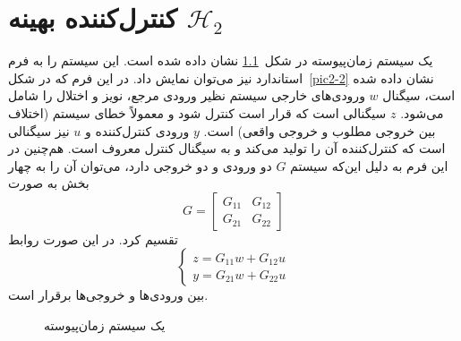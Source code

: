 \chapter{کنترل‌کننده بهینه $\mathcal{H}_2$}

یک سیستم زمان‌پیوسته در شکل~\ref{pic2-1} نشان داده شده است. این سیستم را به فرم استاندارد نیز می‌توان نمایش داد. در این فرم که در شکل~\ref{pic2-2} نشان داده شده است، سیگنال $w$ ورودی‌های خارجی سیستم نظیر ورودی مرجع، نویز و اختلال را شامل می‌شود. $z$ سیگنالی است که قرار است کنترل شود و معمولاً خطای سیستم (اختلاف بین خروجی مطلوب و خروجی واقعی) است. $y$ ورودی کنترل‌کننده و $u$ نیز سیگنالی است که کنترل‌کننده آن را تولید می‌کند و به سیگنال کنترل معروف است. هم‌چنین در این فرم به دلیل این‌که سیستم $G$ دو ورودی و دو خروجی دارد، می‌توان آن را به چهار بخش به صورت 
\begin{equation*}
G=
\begin{bmatrix}
G_{11}&G_{12}\\G_{21}&G_{22}
\end{bmatrix} 
\end{equation*}
تقسیم کرد. در این صورت روابط
\begin{equation*}
\left\{\begin{array}{l}
z=G_{11}w+G_{12}u\\
y=G_{21}w+G_{22}u
\end{array}\right. 
\end{equation*}
بین ورودی‌ها و خروجی‌ها برقرار است.

\setlength{\unitlength}{1cm}
\begin{figure}[t]
\centering
{}
\caption{یک سیستم زمان‌پیوسته}
\label{pic2-1}
\end{figure} 

